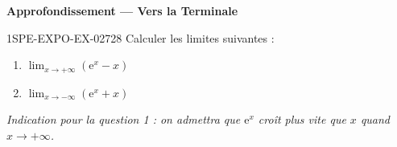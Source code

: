 \begin{center}\textbf{Approfondissement — Vers la Terminale}\end{center}
\begin{exercice}{1SPE-EXPO-EX-027}{2}{8}
Calculer les limites suivantes :
\begin{enumerate}
  \item $\displaystyle\lim_{x \to +\infty} \left(\mathrm{e}^x - x\right)$
  \item $\displaystyle\lim_{x \to -\infty} \left(\mathrm{e}^x + x\right)$
\end{enumerate}
\textit{Indication pour la question 1 : on admettra que $\mathrm{e}^x$ croît plus vite que $x$ quand $x \to +\infty$.}
\end{exercice}
